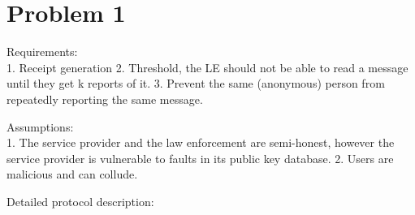 \documentclass{ashoka-crypto}
\author{Aryan Nath} %
\begin{document}
\section*{Problem 1}

Requirements:\\
1. Receipt generation
2. Threshold, the LE should not be able to read a message until they get k reports of it.
3. Prevent the same (anonymous) person from repeatedly reporting the same message.

Assumptions:\\
1. The service provider and the law enforcement are semi-honest, however the service provider is vulnerable to faults in its public key database.
2. Users are malicious and can collude.

Detailed protocol description:
\end{document}
